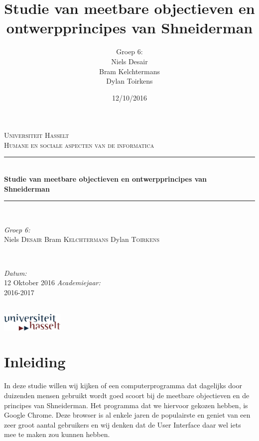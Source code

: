 \documentclass[12pt]{article}
\author{Groep 6:\\
		Niels Desair\\
		Bram Kelchtermans\\
		Dylan Toirkens}
\title{\textbf{Studie van meetbare objectieven en ontwerpprincipes van Shneiderman}}
\date{12/10/2016}
\begin{document}
	\begin{titlepage}
		
		\newcommand{\HRule}{\rule{\linewidth}{0.5mm}} %
		
		\begin{center} %
			
			\textsc{\LARGE Universiteit Hasselt}\\[1.5cm] %
			\textsc{\Large Humane en sociale aspecten van de informatica}\\[0.5cm] %
			
			\HRule \\[0.4cm]
			{ \huge \bfseries Studie van meetbare objectieven en ontwerpprincipes van Shneiderman}\\[0.4cm]
			\HRule \\[1.5cm]
			
			\begin{minipage}{0.4\textwidth}
				\begin{flushleft} \large
					\emph{Groep 6:}\\
					Niels \textsc{Desair} \newline
					Bram \textsc{Kelchtermans} \newline
					Dylan \textsc{Toirkens}
				\end{flushleft}
			\end{minipage}
			~
			\begin{minipage}{0.4\textwidth}
				\begin{flushright} \large
					\emph{Datum:}\\
					12 Oktober 2016
					\emph{Academiejaar: } \\
					2016-2017
				\end{flushright}
			\end{minipage}\\[3cm]
			\vspace{25 mm}
			\includegraphics[width=3.0cm]{UHasselt-logo.jpg}\\[2.0cm]  
		\end{center}
	\end{titlepage}

\newpage
\tableofcontents
\section{Inleiding}
In deze studie willen wij kijken of een computerprogramma dat dagelijks door duizenden mensen gebruikt wordt goed scoort bij de meetbare objectieven en de principes van Shneiderman. Het programma dat we hiervoor gekozen hebben, is Google Chrome. Deze browser is al enkele jaren de populairste en geniet van een zeer groot aantal gebruikers en wij denken dat de User Interface daar wel iets mee te maken zou kunnen hebben.
\newpage
\end{document}
